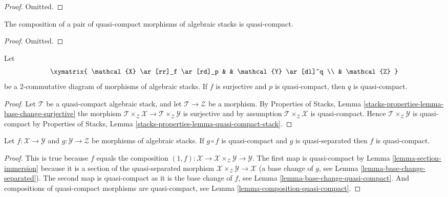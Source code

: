 \begin{proof}
Omitted.
\end{proof}

\begin{lemma}
\label{lemma-composition-quasi-compact}
The composition of a pair of quasi-compact morphisms of algebraic stacks
is quasi-compact.
\end{lemma}

\begin{proof}
Omitted.
\end{proof}

\begin{lemma}
\label{lemma-surjection-from-quasi-compact}
Let
$$
\xymatrix{
\mathcal{X} \ar[rr]_f \ar[rd]_p & &
\mathcal{Y} \ar[dl]^q \\
& \mathcal{Z}
}
$$
be a $2$-commutative diagram of morphisms of algebraic stacks.
If $f$ is surjective and $p$ is quasi-compact, then $q$ is quasi-compact.
\end{lemma}

\begin{proof}
Let $\mathcal{T}$ be a quasi-compact algebraic stack, and let
$\mathcal{T} \to \mathcal{Z}$ be a morphism. By
Properties of Stacks,
Lemma \ref{stacks-properties-lemma-base-change-surjective}
the morphism
$\mathcal{T} \times_\mathcal{Z} \mathcal{X} \to
\mathcal{T} \times_\mathcal{Z} \mathcal{Y}$
is surjective and by assumption
$\mathcal{T} \times_\mathcal{Z} \mathcal{X}$
is quasi-compact. Hence
$\mathcal{T} \times_\mathcal{Z} \mathcal{Y}$
is quasi-compact by
Properties of Stacks, Lemma \ref{stacks-properties-lemma-quasi-compact-stack}.
\end{proof}

\begin{lemma}
\label{lemma-quasi-compact-permanence}
Let $f : \mathcal{X} \to \mathcal{Y}$ and
$g : \mathcal{Y} \to \mathcal{Z}$ be morphisms of algebraic stacks.
If $g \circ f$ is quasi-compact and $g$ is quasi-separated
then $f$ is quasi-compact.
\end{lemma}

\begin{proof}
This is true because $f$ equals the composition
$(1, f) : \mathcal{X} \to \mathcal{X} \times_\mathcal{Z} \mathcal{Y} \to
\mathcal{Y}$.
The first map is quasi-compact by
Lemma \ref{lemma-section-immersion}
because it is a section of the quasi-separated morphism
$\mathcal{X} \times_\mathcal{Z} \mathcal{Y} \to \mathcal{X}$
(a base change of $g$, see
Lemma \ref{lemma-base-change-separated}).
The second map is quasi-compact as it is the base change of $f$, see
Lemma \ref{lemma-base-change-quasi-compact}.
And compositions of quasi-compact
morphisms are quasi-compact, see Lemma \ref{lemma-composition-quasi-compact}.
\end{proof}

